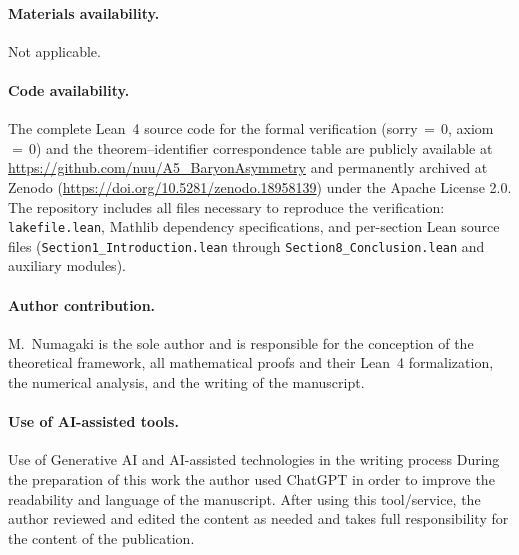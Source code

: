 \documentclass[sn-mathphys-num,Numbered]{sn-jnl}
\theoremstyle{thmstyleone}
\theoremstyle{thmstylethree}
\theoremstyle{thmstyletwo}
\begin{document}
\paragraph{Materials availability.}
Not applicable.

\paragraph{Code availability.}
The complete Lean~4 source code for the formal verification
(sorry\,$=$\,0, axiom\,$=$\,0) and the theorem--identifier
correspondence table are publicly available at
\url{https://github.com/nuu/A5_BaryonAsymmetry}
and permanently archived at Zenodo
(\url{https://doi.org/10.5281/zenodo.18958139})
under the Apache License 2.0.
The repository includes all files necessary to reproduce
the verification: \texttt{lakefile.lean}, Mathlib dependency
specifications, and per-section Lean source files
(\texttt{Section1\_Introduction.lean} through
\texttt{Section8\_Conclusion.lean} and auxiliary modules).

\paragraph{Author contribution.}
M.~Numagaki is the sole author and is responsible for the
conception of the theoretical framework,
all mathematical proofs and their Lean~4 formalization,
the numerical analysis, and the writing of the manuscript.

\paragraph{Use of AI-assisted tools.}
Use of Generative AI and AI-assisted technologies in the writing process
During the preparation of this work the author used ChatGPT in order to improve the readability and language of the manuscript. After using this tool/service, the author reviewed and edited the content as needed and takes full responsibility for the content of the publication.
\end{document}

